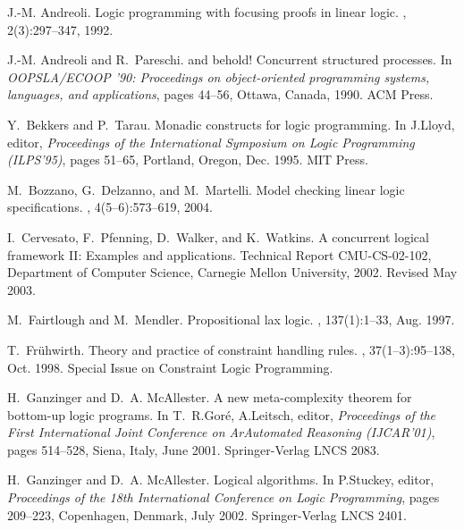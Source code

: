 \documentclass{sig-alt}
\begin{document}
\begin{thebibliography}{50}
\vspace*{0.5mm}
\scriptsize

J.-M. Andreoli.
\newblock Logic programming with focusing proofs in linear logic.
, 2(3):297--347, 1992.

J.-M. Andreoli and R.~Pareschi.
 and behold! {C}oncurrent structured processes.
\newblock In {\em {OOPSLA/ECOOP} '90: {P}roceedings on object-oriented
  programming systems, languages, and applications}, pages 44--56, Ottawa,
  Canada, 1990. ACM Press.

Y.~Bekkers and P.~Tarau.
\newblock Monadic constructs for logic programming.
\newblock In J.Lloyd, editor, {\em Proceedings of the International Symposium
  on Logic Programming (ILPS'95)}, pages 51--65, Portland, Oregon, Dec. 1995.
  MIT Press.

M.~Bozzano, G.~Delzanno, and M.~Martelli.
\newblock Model checking linear logic specifications.
, 4(5--6):573--619,
  2004.

I.~Cervesato, F.~Pfenning, D.~Walker, and K.~Watkins.
\newblock A concurrent logical framework {II}: Examples and applications.
\newblock Technical Report CMU-CS-02-102, Department of Computer Science,
  Carnegie Mellon University, 2002.
\newblock Revised May 2003.

M.~Fairtlough and M.~Mendler.
\newblock Propositional lax logic.
, 137(1):1--33, Aug. 1997.

T.~Fr{\"u}hwirth.
\newblock Theory and practice of constraint handling rules.
, 37(1--3):95--138, Oct. 1998.
\newblock Special Issue on Constraint Logic Programming.

H.~Ganzinger and D.~A. McAllester.
\newblock A new meta-complexity theorem for bottom-up logic programs.
\newblock In T.~R.Gor{\'e}, A.Leitsch, editor, {\em Proceedings of the First
  International Joint Conference on ArAutomated Reasoning (IJCAR'01)}, pages
  514--528, Siena, Italy, June 2001. Springer-Verlag LNCS 2083.

H.~Ganzinger and D.~A. McAllester.
\newblock Logical algorithms.
\newblock In P.Stuckey, editor, {\em Proceedings of the 18th International
  Conference on Logic Programming}, pages 209--223, Copenhagen, Denmark, July
  2002. Springer-Verlag LNCS 2401.


\end{thebibliography}
\end{document}
